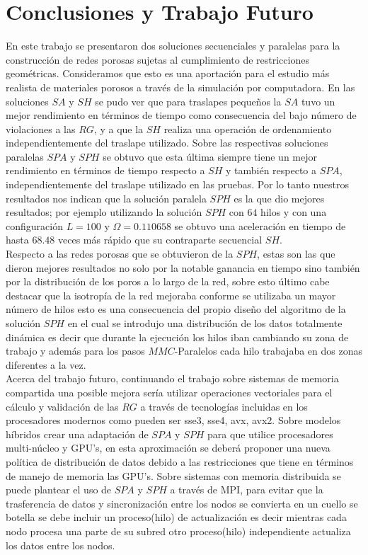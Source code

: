 \chapter{Conclusiones y Trabajo Futuro}
\label{champ:conclusions}
\bigskip
\barra
\bigskip

En este trabajo se presentaron dos soluciones secuenciales y paralelas para la construcción de redes porosas sujetas al cumplimiento de restricciones geométricas. Consideramos que esto es una aportación para el estudio más realista de materiales porosos a través de la simulación por computadora. En las soluciones $SA$ y $SH$ se pudo ver que para traslapes pequeños la $SA$ tuvo un mejor rendimiento en términos de tiempo como consecuencia del bajo número de violaciones a las $RG$, y a que la $SH$ realiza una operación de ordenamiento independientemente del traslape utilizado. Sobre las respectivas soluciones paralelas $SPA$ y $SPH$ se obtuvo que esta última siempre tiene un mejor rendimiento en términos de tiempo respecto a $SH$ y también respecto a $SPA$, independientemente del traslape utilizado en las pruebas.  Por lo tanto nuestros resultados nos indican que la solución paralela $SPH$ es la que dio mejores resultados; por ejemplo utilizando la solución $SPH$ con $64$ hilos y con una configuración $L=100$ y $\Omega=0.110658$ se obtuvo una aceleración en tiempo de hasta $68.48$ veces más rápido que su contraparte secuencial $SH$.\\

Respecto a las redes porosas que se obtuvieron de la $SPH$, estas son las que dieron mejores resultados no solo por la notable ganancia en tiempo sino también por la distribución de los poros a lo largo de la red, sobre esto último cabe destacar que la isotropía de la red mejoraba conforme se utilizaba un mayor número de hilos esto es una consecuencia del propio diseño del algoritmo de la solución $SPH$ en el cual se introdujo una distribución de los datos totalmente dinámica es decir que durante la ejecución los hilos iban cambiando su zona de trabajo y además para los pasos $MMC$-Paralelos cada hilo trabajaba en dos zonas diferentes a la vez.\\

Acerca del trabajo futuro, continuando el trabajo sobre sistemas de memoria compartida una posible mejora sería utilizar operaciones vectoriales para el cálculo y validación de las $RG$ a través de tecnologías incluidas en los procesadores modernos como pueden ser sse3, sse4, avx, avx2. Sobre modelos híbridos crear una adaptación de $SPA$ y $SPH$ para que utilice procesadores multi-núcleo y GPU's, en esta aproximación se deberá proponer una nueva política de distribución de datos debido a las restricciones que tiene en términos de manejo de memoria las GPU's. Sobre sistemas con memoria distribuida se puede plantear el uso de $SPA$ y $SPH$ a través de MPI, para evitar que la trasferencia de datos y sincronización entre los nodos se convierta en un cuello se botella se debe incluir un proceso(hilo) de actualización es decir mientras cada nodo procesa una parte de su subred otro proceso(hilo) independiente actualiza los datos entre los nodos.



